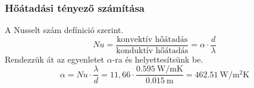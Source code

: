 	\subsubsection{Hőátadási tényező számítása}
		A Nusselt szám defínició szerint.
                      \begin{equation*}
                     Nu = \frac{\text{konvektív hőátadás}}{\text{konduktív hőátadás}} = \alpha \cdot \frac{d}{\lambda}
                       \end{equation*}
                     Rendezzük át az egyenletet $\alpha$-ra és helyettesítsünk be.
                      \begin{equation}
			\alpha = Nu \cdot \frac{\lambda}{d} = 11,66 \cdot \frac{\SI{0,595}{\watt\per\meter\kelvin}}{\SI{0,015}{\meter}}= \SI{462,51}{\watt\per\meter\squared\kelvin} 
		\end{equation}		
\pagebreak



